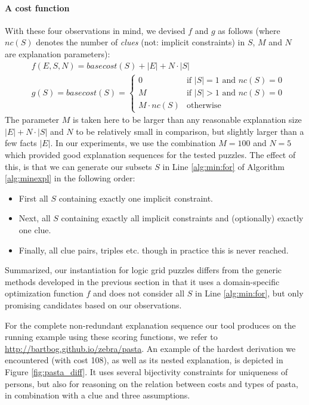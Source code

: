 \paragraph{A cost function}
With these four observations in mind, we devised $f$ and $g$ as follows (where $nc(S)$ denotes the number of \emph{clues} (not: implicit constraints) in $S$, $M$ and $N$ are explanation parameters): \label{sec:cost}
\begin{align*}&f(E,S,N) = basecost(S) + |E| + N \cdot|S|\\
&g(S) = basecost(S) = \left\{\begin{array}{ll}
                               0 & \text{if $|S|=1$ and $nc(S) = 0$}\\
                               M & \text{if $|S|>1$ and $nc(S)=0$}\\
                               M\cdot nc(S) & \text{otherwise}
                              \end{array}\right.
                              \end{align*}
The parameter $M$ is taken here to be larger than any reasonable explanation size $|E| + N \cdot|S|$ and $N$ to be relatively small in comparison, but slightly larger than a few facts $|E|$. In our experiments, we use the combination $M=100$ and $N=5$ which provided good explanation sequences for the tested puzzles.
The effect of this, is that we can generate our subsets $S$ in Line \ref{alg:min:for}
 of Algorithm \ref{alg:minexpl} in the following order:
\begin{itemize}
 \item First all $S$ containing exactly one implicit constraint.
 \item Next, all $S$ containing exactly all implicit constraints and (optionally) exactly one clue.
 \item Finally, all clue pairs, triples etc. though in practice this is never reached.
\end{itemize}
Summarized, our instantiation for logic grid puzzles differs from the generic methods developed in the previous section in that it uses a domain-specific optimization function $f$ and does not consider all $S$ in Line \ref{alg:min:for}, but only promising candidates based on our observations.

For the complete non-redundant explanation sequence our tool produces on the running example using these scoring functions, we refer to \url{http://bartbog.github.io/zebra/pasta}. An example of the hardest derivation we encountered (with cost 108), as well as its nested explanation, is depicted in Figure \ref{fig:pasta_diff}. It uses several bijectivity constraints for uniqueness of persons, but also for reasoning on the relation between costs and types of pasta, in combination with a clue and three assumptions.

